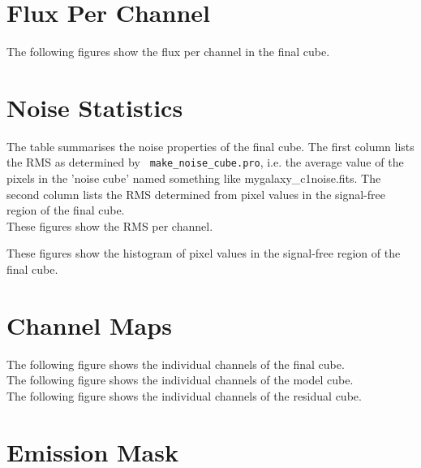 \documentclass[11pt]{article}
\begin{document}
\section{Flux Per Channel}
\label{sect:perchannel}
%

\noindent The following figures show the flux per channel in the final cube.



\section{Noise Statistics}
\label{sec:noise_stats}

\noindent The table summarises the noise properties of the final
cube. The first column lists the RMS as determined by {\tt
  make\_noise\_cube.pro}, i.e. the average value of the pixels in the
'noise cube' named something like mygalaxy\_c1noise.fits. The second
column lists the RMS determined from pixel values in the 
signal-free region of the final cube. \\



\noindent These figures show the RMS per channel.



\noindent These figures show the histogram of pixel values in the
 signal-free region of the final cube.



\section{Channel Maps}
\label{sect:channel_maps}

\noindent The following figure shows the individual channels of the final cube.\\


\noindent The following figure shows the individual channels of the model cube.\\


\noindent The following figure shows the individual channels of the residual cube.\\


%

\section{Emission Mask}
\label{sect:emission_mask}
\end{document}
